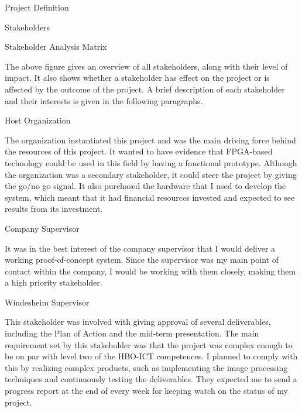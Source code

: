 \documentclass{matthijs}
\begin{document}
\begin{hoofdstuk}{Project Definition}
\begin{paragraaf}{Stakeholders}
\begin{figuur}{Stakeholder Analysis Matrix}
{\begin{tikzpicture}[baseline=(current bounding box.north)]
				\end{tikzpicture}
				}
			\end{figuur}
			\vspace{-1ex}

			\noindent The above figure gives an overview of all stakeholders, along with their level of impact.
			It also shows whether a stakeholder has effect on the project or is affected by the outcome of the project.
			A brief description of each stakeholder and their interests is given in the following paragraphs.

			
			\begin{subparagraaf}{Host Organization}

				The organization instantiated this project and was the main driving force behind the resources of this project.
				It wanted to have evidence that FPGA-based technology could be used in this field by having a functional prototype.
				Although the organization was a secondary stakeholder, it could steer the project by giving the go/no go signal.
				It also purchased the hardware that I used to develop the system, which meant that it had financial resources invested and expected to see results from its investment.

			\end{subparagraaf}

			\begin{subparagraaf}{Company Supervisor}

				It was in the best interest of the company supervisor that I would deliver a working proof-of-concept system.
				Since the supervisor was my main point of contact within the company, I would be working with them closely, making them a high priority stakeholder.


			\end{subparagraaf}

			\begin{subparagraaf}{Windesheim Supervisor}

				This stakeholder was involved with giving approval of several deliverables, including the Plan of Action and the mid-term presentation.
				The main requirement set by this stakeholder was that the project was complex enough to be on par with level two of the HBO-ICT competences.
				I planned to comply with this by realizing complex products, such as implementing the image processing techniques and continuously testing the deliverables.
				They expected me to send a progress report at the end of every week for keeping watch on the status of my project.


\end{subparagraaf}
\end{paragraaf}
\end{hoofdstuk}
\end{document}
